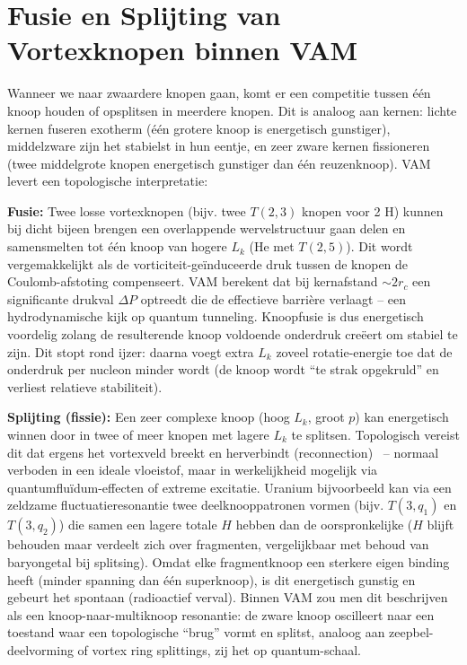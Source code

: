 \section{Fusie en Splijting van Vortexknopen binnen VAM}

Wanneer we naar zwaardere knopen gaan, komt er een competitie tussen één knoop houden of opsplitsen in meerdere knopen. Dit is analoog aan kernen: lichte kernen fuseren exotherm (één grotere knoop is energetisch gunstiger), middelzware zijn het stabielst in hun eentje, en zeer zware kernen fissioneren (twee middelgrote knopen energetisch gunstiger dan één reuzenknoop). VAM levert een topologische interpretatie:

\textbf{Fusie:} Twee losse vortexknopen (bijv. twee $T(2,3)$ knopen voor 2 H) kunnen bij dicht bijeen brengen een overlappende wervelstructuur gaan delen en samensmelten tot één knoop van hogere $L_k$ (He met $T(2,5)$). Dit wordt vergemakkelijkt als de vorticiteit-geïnduceerde druk tussen de knopen de Coulomb-afstoting compenseert. VAM berekent dat bij kernafstand $\sim 2r_c$ een significante drukval $\Delta P$ optreedt die de effectieve barrière verlaagt – een hydrodynamische kijk op quantum tunneling. Knoopfusie is dus energetisch voordelig zolang de resulterende knoop voldoende onderdruk creëert om stabiel te zijn. Dit stopt rond ijzer: daarna voegt extra $L_k$ zoveel rotatie-energie toe dat de onderdruk per nucleon minder wordt (de knoop wordt “te strak opgekruld” en verliest relatieve stabiliteit).

\textbf{Splijting (fissie):} Een zeer complexe knoop (hoog $L_k$, groot $p$) kan energetisch winnen door in twee of meer knopen met lagere $L_k$
te splitsen. Topologisch vereist dit dat ergens het vortexveld breekt en herverbindt (reconnection)~\cite{Kleckner2013KnotsVortex} – normaal verboden in een ideale vloeistof, maar in werkelijkheid mogelijk via quantumfluïdum-effecten of extreme excitatie. Uranium bijvoorbeeld kan via een zeldzame fluctuatieresonantie twee deelknooppatronen vormen (bijv. $T(3,q_1)$ en $T(3,q_2)$) die samen een lagere totale $H$ hebben dan de oorspronkelijke ($H$ blijft behouden maar verdeelt zich over fragmenten, vergelijkbaar met behoud van baryongetal bij splitsing). Omdat elke fragmentknoop een sterkere eigen binding heeft (minder spanning dan één superknoop), is dit energetisch gunstig en gebeurt het spontaan (radioactief verval). Binnen VAM zou men dit beschrijven als een knoop-naar-multiknoop resonantie: de zware knoop oscilleert naar een toestand waar een topologische “brug” vormt en splitst, analoog aan zeepbel-deelvorming of vortex ring splittings, zij het op quantum-schaal.

